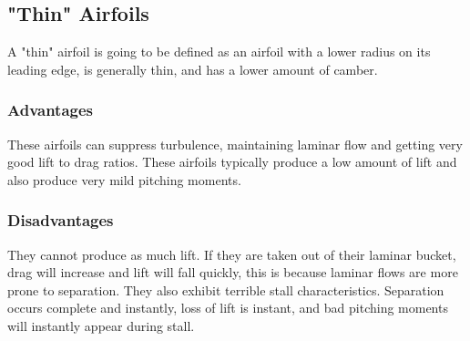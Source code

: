 \subsection{"Thin" Airfoils}
\begin{comment}
\end{comment}
A "thin" airfoil is going to be defined as an airfoil with a lower radius on its leading edge, is generally thin, and has a lower amount of camber.

\subsubsection{Advantages}
\begin{comment}
\end{comment}
These airfoils can suppress turbulence, maintaining laminar flow and getting very good lift to drag ratios. 
These airfoils typically produce a low amount of lift and also produce very mild pitching moments.

\subsubsection{Disadvantages}
\begin{comment}
\end{comment}
They cannot produce as much lift.
If they are taken out of their laminar bucket, drag will increase and lift will fall quickly, this is because laminar flows are more prone to separation.
They also exhibit terrible stall characteristics. Separation occurs complete and instantly, loss of lift is instant, and bad pitching moments will instantly appear during stall.

